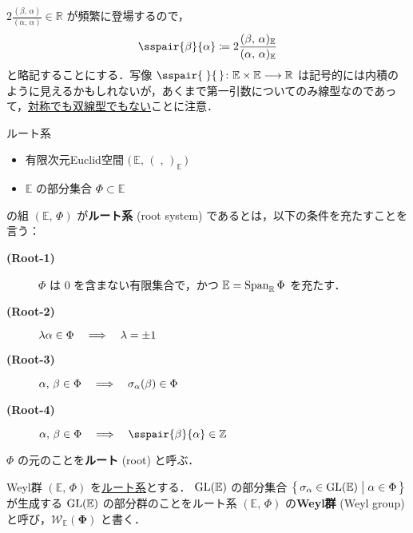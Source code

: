 \documentclass{ltjsarticle}
\theoremstyle{mystyle} %
\numberwithin{equation}{section}
\newcommand{\lto}{\longrightarrow}
\newcommand{\Euc}[1]{\bigl(\, #1,\, (\;,\,)_{#1}\,\bigr)}
\newcommand{\Weyl}[2]{\mathscr{W}_{#1}(#2)}
\begin{document}
\begin{marker}
    $2 \frac{(\beta,\, \alpha)}{(\alpha,\, \alpha)} \in \mathbb{R}$ が頻繁に登場するので，
    \begin{align}
		\sspair{\beta}{\alpha} \coloneqq 2\frac{(\beta,\, \alpha)_{\mathbb{E}}}{(\alpha,\, \alpha)_{\mathbb{E}}}
	\end{align}
	と略記することにする．写像 $\sspair{\;}{\,} \colon \mathbb{E} \times \mathbb{E} \lto \mathbb{R}$ は記号的には内積のように見えるかもしれないが，あくまで第一引数についてのみ線型なのであって，\underline{対称でも双線型でもない}ことに注意．
\end{marker}

\begin{myaxiom}[label=ax:root-system,breakable]{ルート系}
	\begin{itemize}
		\item 有限次元Euclid空間 $\Euc{\mathbb{E}}$ 
		\item $\mathbb{E}$ の部分集合 $\Phi \subset \mathbb{E}$
	\end{itemize}
	の組 $(\mathbb{E},\, \Phi)$ が\textbf{ルート系} (root system) であるとは，以下の条件を充たすことを言う：
	\begin{description}
		\item[\textbf{(Root-1)}] $\Phi$ は $0$ を含まない有限集合で，かつ $\mathbb{E} = \operatorname{Span}_{\mathbb{R}} \Phi$ を充たす．
		\item[\textbf{(Root-2)}] $\lambda \alpha \in \Phi \quad \Longrightarrow \quad \lambda = \pm 1$
		\item[\textbf{(Root-3)}] $\alpha,\, \beta \in \Phi \quad \Longrightarrow \quad \sigma_\alpha(\beta) \in \Phi$
		\item[\textbf{(Root-4)}] $\alpha,\, \beta \in \Phi \IMP \sspair{\beta}{\alpha} \in \mathbb{Z}$
	\end{description}
	\tcblower
	$\Phi$ の元のことを\textbf{ルート} (root) と呼ぶ．
\end{myaxiom}


\begin{mydef}[label=def:Weylgroup]{Weyl群}
	$(\mathbb{E},\, \Phi)$ を\hyperref[ax:root-system]{ルート系}とする．
	$\mathrm{GL} (\mathbb{E})$ の部分集合 $\bigl\{\, \sigma_\alpha \in \mathrm{GL}(\mathbb{E}) \bigm| \alpha \in \Phi \,\bigr\}$ が生成する $\mathrm{GL}(\mathbb{E})$ の部分群のことをルート系 $(\mathbb{E},\, \Phi)$ の\textbf{Weyl群} (Weyl group) と呼び，$\bm{\Weyl{\mathbb{E}}{\Phi}}$ と書く．
	
	
\end{mydef}
\end{document}
